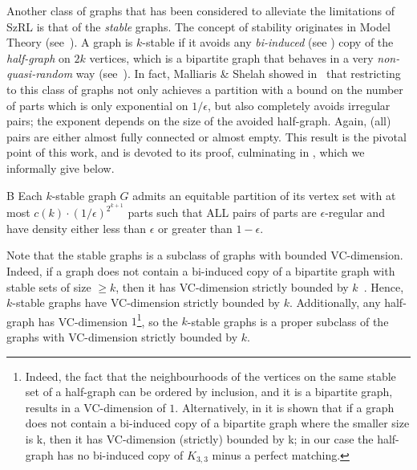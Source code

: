         Another class of graphs that has been considered to alleviate the limitations of SzRL is that of the \emph{stable}
        graphs.
        The concept of stability originates in Model Theory
        (see~\cite{classification_theory_and_the_number_of_non_isomorphic_models}).
        A graph is $k$-stable if it avoids any \emph{bi-induced} (see ) copy of the \emph{half-graph}
        on $2k$ vertices, which is a bipartite graph that behaves in a very \emph{non-quasi-random} way (see~).
        In fact, Malliaris \& Shelah showed in~\cite[Theorem 5.19]{regularity_lemmas_for_stable_graphs} that restricting
        to this class of graphs not only achieves a partition with a bound on the number of parts which is only exponential
        on $1/\epsilon$, but also completely avoids irregular pairs; the exponent depends on the size of the avoided half-graph.
        Again, (all) pairs are either almost fully connected or almost empty.
        This result is the pivotal point of this work, and  is devoted to its proof,
        culminating in , which we informally give below.

        \begin{thm*}{B} \label{thm:B}
            Each $k$-stable graph $G$ admits an equitable partition of its vertex set with at most
            ${c(k)\cdot(1/\epsilon)^{2^{k+1}}}$ parts such that ALL pairs of parts
            are $\epsilon$-regular and have density either less than $\epsilon$ or greater than $1 - \epsilon$.
        \end{thm*}

        Note that the stable graphs is a subclass of graphs with bounded VC-dimension.
        Indeed, if a graph does not contain a bi-induced copy of a bipartite graph with stable sets of size $\geq k$,
        then it has VC-dimension strictly bounded by $k$~\cite{regularity_partitions_and_the_topology_of_graphons}.
        Hence, $k$-stable graphs have VC-dimension strictly bounded by $k$.
        Additionally, any half-graph has VC-dimension $1$\footnote{
            Indeed, the fact that the neighbourhoods of the vertices on the same stable set of a half-graph can be
            ordered by inclusion, and it is a bipartite graph, results in a VC-dimension of $1$.
            Alternatively, in \cite{regularity_partitions_and_the_topology_of_graphons} it is shown that if a graph does not
            contain a bi-induced copy of a bipartite graph where the smaller size is k, then it has VC-dimension (strictly)
            bounded by k; in our case the half-graph has no bi-induced copy of $K_{3,3}$ minus a perfect matching.},
        so the $k$-stable graphs is a proper subclass of the graphs with VC-dimension strictly bounded by $k$.

